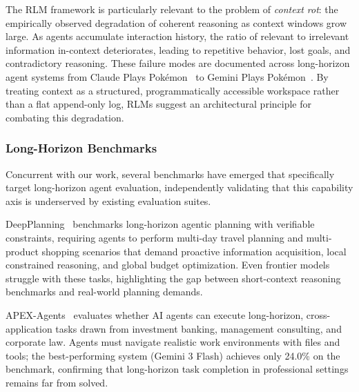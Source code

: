 The RLM framework is particularly relevant to the problem of \emph{context rot}: the empirically observed degradation of coherent reasoning as context windows grow large. As agents accumulate interaction history, the ratio of relevant to irrelevant information in-context deteriorates, leading to repetitive behavior, lost goals, and contradictory reasoning. These failure modes are documented across long-horizon agent systems from Claude Plays Pok\'{e}mon~\citep{anthropic2025visible} to Gemini Plays Pok\'{e}mon~\citep{zhang2025geminiplayspokemon}. By treating context as a structured, programmatically accessible workspace rather than a flat append-only log, RLMs suggest an architectural principle for combating this degradation.


\subsubsection{Long-Horizon Benchmarks}\label{sec:long_horizon_benchmarks}

Concurrent with our work, several benchmarks have emerged that specifically target long-horizon agent evaluation, independently validating that this capability axis is underserved by existing evaluation suites.

DeepPlanning~\citep{zhang2026deepplanning} benchmarks long-horizon agentic planning with verifiable constraints, requiring agents to perform multi-day travel planning and multi-product shopping scenarios that demand proactive information acquisition, local constrained reasoning, and global budget optimization. Even frontier models struggle with these tasks, highlighting the gap between short-context reasoning benchmarks and real-world planning demands.

APEX-Agents~\citep{vidgen2026apex} evaluates whether AI agents can execute long-horizon, cross-application tasks drawn from investment banking, management consulting, and corporate law. Agents must navigate realistic work environments with files and tools; the best-performing system (Gemini 3 Flash) achieves only 24.0\% on the benchmark, confirming that long-horizon task completion in professional settings remains far from solved.

